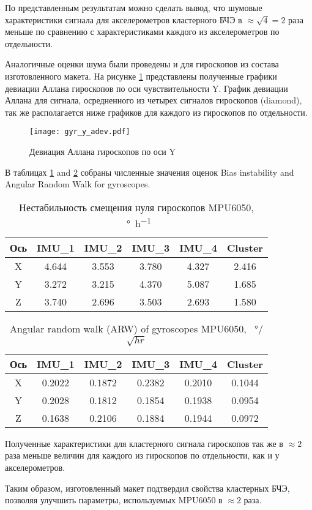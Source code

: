По представленным результатам можно сделать вывод, что шумовые характеристики сигнала для акселерометров кластерного БЧЭ в $\approx\sqrt{4} = 2$ раза меньше по сравнению с характеристиками каждого
из акселерометров по отдельности.

Аналогичные оценки шума были проведены и для гироскопов из состава изготовленного макета. На рисунке \ref{fig:gyr_y_allan} представлены полученные графики девиации Аллана гироскопов по оси чувствительности Y.
График девиации Аллана для сигнала, осредненного из четырех сигналов гироскопов (diamond), так же располагается ниже графиков для каждого из гироскопов по отдельности.

\begin{figure}[h!]
	\centering
	\texttt{[image: gyr\_y\_adev.pdf]}
	\caption{Девиация Аллана гироскопов по оси Y}
	\label{fig:gyr_y_allan}
\end{figure}

В таблицах \ref{table:gyro_bias} and \ref{table:gyro_arw} собраны численные значения оценок Bias instability and Angular Random Walk for gyroscopes.

\begin{table}[h!]
	\centering
	\caption{Нестабильность смещения нуля гироскопов MPU6050, \SI[per-mode=symbol]{}{\degree\per\hour}}
	\begin{tabular}{| c | c | c | c | c | c |}
	\hline
	Ось & IMU\_1 & IMU\_2 & IMU\_3 & IMU\_4 & Cluster \\ \hline
	X & 4.644 & 3.553 & 3.780 & 4.327 & 2.416 \\ \hline
	Y & 3.272 & 3.215 & 4.370 & 5.087 & 1.685 \\ \hline
	Z & 3.740 & 2.696 & 3.503 & 2.693 & 1.580 \\
	\hline
	\end{tabular}
	\label{table:gyro_bias}
\end{table}

\begin{table}[h!]
	\centering
	\caption{Angular random walk (ARW) of gyroscopes MPU6050, \SI[per-mode=symbol]{}{\degree}/$\sqrt{hr}$}
	\begin{tabular}{| c | c | c | c | c | c |}
	\hline
	Ось & IMU\_1 & IMU\_2 & IMU\_3 & IMU\_4 & Cluster \\ \hline
	X & 0.2022 & 0.1872 & 0.2382 & 0.2010 & 0.1044 \\ \hline
	Y & 0.2028 & 0.1812 & 0.1854 & 0.1938 & 0.0954 \\ \hline
	Z & 0.1638 & 0.2106 & 0.1884 & 0.1944 & 0.0972 \\
	\hline
	\end{tabular}
	\label{table:gyro_arw}
\end{table}

Полученные характеристики для кластерного сигнала гироскопов так же в $\approx2$ раза меньше величин для каждого из гироскопов по отдельности, как и у акселерометров.

Таким образом, изготовленный макет подтвердил свойства кластерных БЧЭ, позволяя улучшить параметры, используемых MPU6050 в $\approx2$ раза.

\newpage